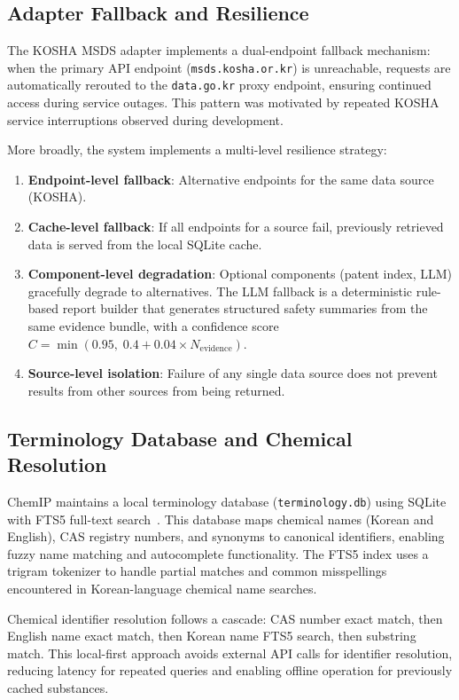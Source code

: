 \documentclass[10pt]{article}
\begin{document}
\subsection{Adapter Fallback and Resilience}

The KOSHA MSDS adapter implements a dual-endpoint fallback mechanism: when the primary API endpoint (\texttt{msds.kosha.or.kr}) is unreachable, requests are automatically rerouted to the \texttt{data.go.kr} proxy endpoint, ensuring continued access during service outages.
This pattern was motivated by repeated KOSHA service interruptions observed during development.

More broadly, the system implements a multi-level resilience strategy:
\begin{enumerate}[nosep]
  \item \textbf{Endpoint-level fallback}: Alternative endpoints for the same data source (KOSHA).
  \item \textbf{Cache-level fallback}: If all endpoints for a source fail, previously retrieved data is served from the local SQLite cache.
  \item \textbf{Component-level degradation}: Optional components (patent index, LLM) gracefully degrade to alternatives. The LLM fallback is a deterministic rule-based report builder that generates structured safety summaries from the same evidence bundle, with a confidence score $C = \min(0.95,\; 0.4 + 0.04 \times N_{\text{evidence}})$.
  \item \textbf{Source-level isolation}: Failure of any single data source does not prevent results from other sources from being returned.
\end{enumerate}

\subsection{Terminology Database and Chemical Resolution}

ChemIP maintains a local terminology database (\texttt{terminology.db}) using SQLite with FTS5 full-text search~\cite{sqlite_fts5}.
This database maps chemical names (Korean and English), CAS registry numbers, and synonyms to canonical identifiers, enabling fuzzy name matching and autocomplete functionality.
The FTS5 index uses a trigram tokenizer to handle partial matches and common misspellings encountered in Korean-language chemical name searches.

Chemical identifier resolution follows a cascade: CAS number exact match, then English name exact match, then Korean name FTS5 search, then substring match.
This local-first approach avoids external API calls for identifier resolution, reducing latency for repeated queries and enabling offline operation for previously cached substances.
\end{document}

